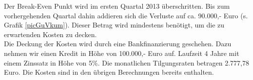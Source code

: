 Der Break-Even Punkt wird im ersten Quartal 2013 überschritten. Bis zum vorhergehenden Quartal dahin addieren sich die Verluste auf ca. 90.000,- Euro (s. Grafik \ref{picGuVkum}). Dieser Betrag wird mindestens benötigt, um die zu erwartenden Kosten zu decken.\\
Die Deckung der Kosten wird durch eine Bankfinanzierung geschehen. Dazu nehmen wir einen Kredit in Höhe von 100.000,- Euro auf. Laufzeit 4 Jahre mit einem Zinssatz in Höhe von 5\%. Die monatlichen Tilgungsraten betragen 2.777,78 Euro. Die Kosten sind in den übrigen Berechnungen bereits enthalten.


